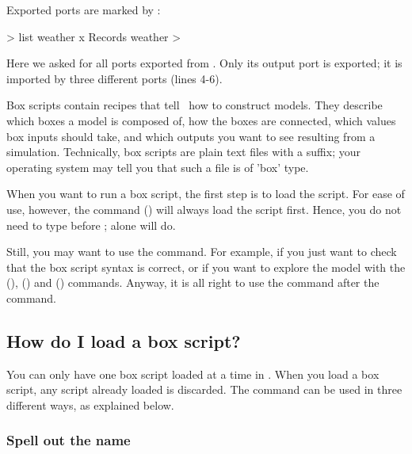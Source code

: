 Exported ports are marked by \code{>{}>}:

\lstset{numbers=left}
\begin{usdialog}
> list weather x
Records weather
>
\end{usdialog}
\lstset{numbers=none}

Here we asked for all ports exported from . Only its  output port is exported; it is imported by three different  ports (lines 4-6).


Box scripts contain recipes that tell \US\ how to construct models. They describe which boxes a model is composed of, how the boxes are connected, which values box inputs should take, and which outputs you want to see resulting from a simulation. Technically, box scripts are plain text files with a  suffix; your operating system may tell you that such a file is of 'box' type. 

When you want to run a box script, the first step is to load the script. For ease of use, however, the  command () will always load the script first. Hence, you do not need to type  before ;  alone will do.

Still, you may want to use the  command. For example, if you just want to check that the box script syntax is correct, or if you want to explore the model with the  (),  () and  () commands. Anyway, it is all right to use the  command after the  command.

\subsection{How do I load a box script?}
You can only have one box script loaded at a time in \US. When you load a box script, any script already loaded is discarded. The  command can be used in three different ways, as explained below.

\subsubsection{Spell out the name}


